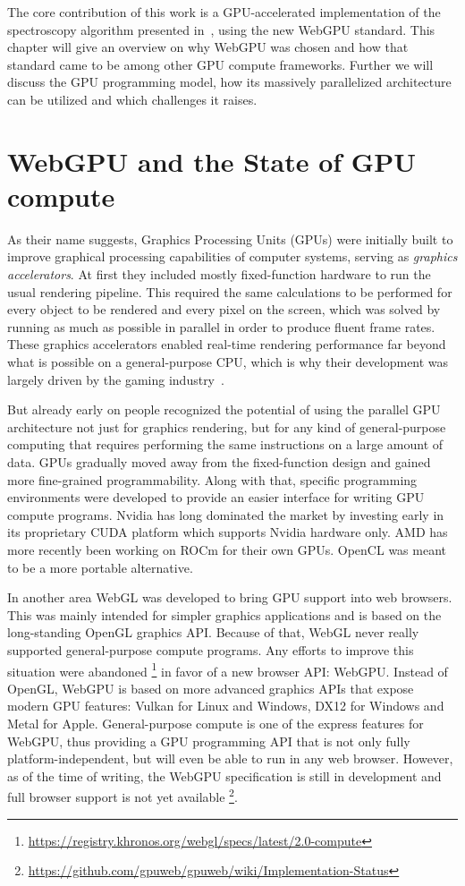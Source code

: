 The core contribution of this work is a GPU-accelerated implementation of the
spectroscopy algorithm presented in~\cite{bisping2023process},
using the new WebGPU standard.
This chapter will give an overview on why WebGPU was chosen and how that
standard came to be among other GPU compute frameworks.
Further we will discuss the GPU programming model,
how its massively parallelized architecture can be utilized
and which challenges it raises.

\section{WebGPU and the State of GPU compute}

As their name suggests, Graphics Processing Units (GPUs) were initially built
to improve graphical processing capabilities of computer systems,
serving as \emph{graphics accelerators}.
At first they included mostly fixed-function hardware to run the usual
rendering pipeline.
This required the same calculations to be performed for every object to
be rendered and every pixel on the screen,
which was solved by running as much as possible in parallel in order to produce
fluent frame rates.
These graphics accelerators enabled real-time rendering performance far beyond
what is possible on a general-purpose CPU,
which is why their development was largely driven
by the gaming industry~\cite{Patterson2016}.

But already early on people recognized the potential of using the parallel
GPU architecture not just for graphics rendering,
but for any kind of general-purpose computing that requires performing the same
instructions on a large amount of data.
GPUs gradually moved away from the fixed-function design and gained more
fine-grained programmability.
Along with that, specific programming environments were
developed to provide an easier interface for writing GPU compute programs.
Nvidia has long dominated the market by investing early in its
proprietary CUDA platform which supports Nvidia hardware only.
AMD has more recently been working on ROCm for their own GPUs.
OpenCL was meant to be a more portable alternative.

In another area WebGL was developed to bring GPU support into web browsers.
This was mainly intended for simpler graphics applications and is based on the
long-standing OpenGL graphics API\@.
Because of that, WebGL never really supported general-purpose compute programs.
Any efforts to improve this situation were abandoned%
\footnote{\url{https://registry.khronos.org/webgl/specs/latest/2.0-compute}}
in favor of a new browser API\@: WebGPU\@.
Instead of OpenGL, WebGPU is based on more advanced graphics APIs
that expose modern GPU features:
Vulkan for Linux and Windows, DX12 for Windows and Metal for Apple.
General-purpose compute is one of the express features for WebGPU,
thus providing a GPU programming API that is not only fully
platform-independent, but will even be able to run in any web browser.
However, as of the time of writing, the WebGPU specification is still in
development and full browser support is not yet available%
\footnote{\url{https://github.com/gpuweb/gpuweb/wiki/Implementation-Status}}.

